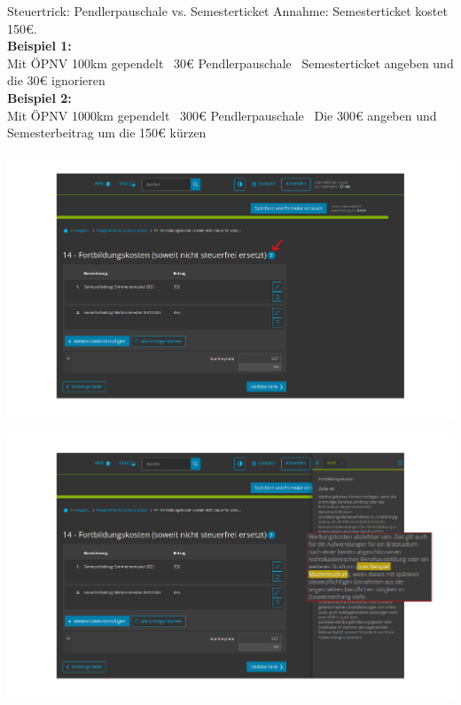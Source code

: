 \documentclass{beamer}
\newcommand{\n}{\hfill\\\vspace{0.25cm}}
\begin{document}
			\begin{frame}{Steuertrick: Pendlerpauschale vs. Semesterticket}
				Annahme: Semesterticket kostet 150€.\n
				\textbf{Beispiel 1:}\\
				Mit ÖPNV 100km gependelt \textrightarrow\ 30€ Pendlerpauschale \textrightarrow\ Semesterticket angeben und die 30€ ignorieren\n
				\textbf{Beispiel 2:}\\
				Mit ÖPNV 1000km gependelt \textrightarrow\ 300€ Pendlerpauschale \textrightarrow\ Die 300€ angeben und Semesterbeitrag um die 150€ kürzen
			\end{frame}
		
			\begin{frame}
				\begin{center}
					\vspace{-0.6cm}
					\hspace*{-0.91cm}
					\includegraphics[scale=0.24]{images/elster-fortbildungskosten-1}
				\end{center}
			\end{frame}
			
			\begin{frame}
				\begin{center}
					\vspace{-0.6cm}
					\hspace*{-0.91cm}
					\includegraphics[scale=0.24]{images/elster-fortbildungskosten-2}
				\end{center}
			\end{frame}
			
\end{document}
